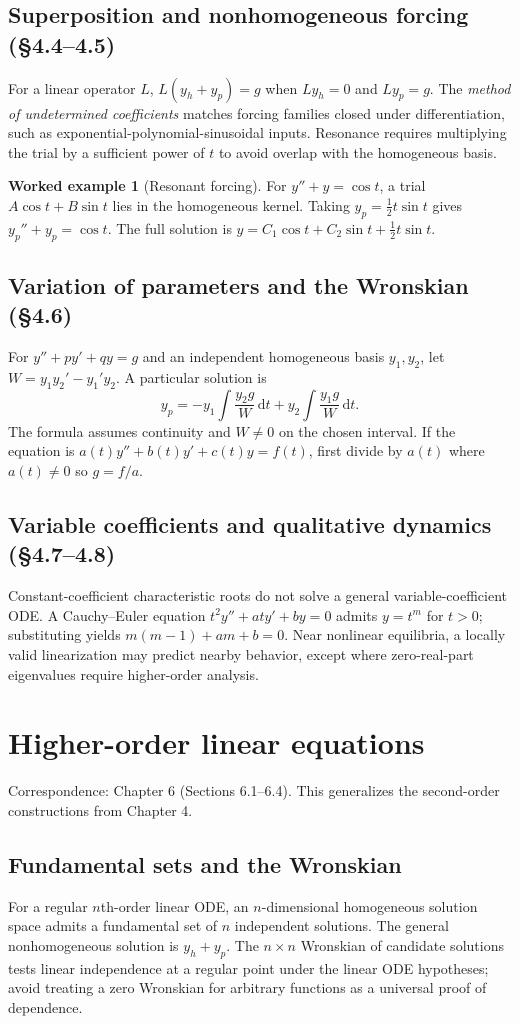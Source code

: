 \documentclass[11pt,letterpaper,oneside]{report}
\theoremstyle{definition}\newtheorem{definition}[theorem]{Definition}
\newtheorem{example}[theorem]{Worked example}
\theoremstyle{remark}\newtheorem{remark}[theorem]{Remark}
\newcommand{\dd}{\,\mathrm{d}}
\begin{document}
\section{Superposition and nonhomogeneous forcing (\S4.4--4.5)}
For a linear operator $L$, $L(y_h+y_p)=g$ when $Ly_h=0$ and $Ly_p=g$. The \emph{method of undetermined coefficients} matches forcing families closed under differentiation, such as exponential-polynomial-sinusoidal inputs. Resonance requires multiplying the trial by a sufficient power of $t$ to avoid overlap with the homogeneous basis.
\begin{example}[Resonant forcing]
For $y''+y=\cos t$, a trial $A\cos t+B\sin t$ lies in the homogeneous kernel. Taking $y_p=\tfrac12 t\sin t$ gives $y_p''+y_p=\cos t$. The full solution is $y=C_1\cos t+C_2\sin t+\tfrac12t\sin t$.
\end{example}
\section{Variation of parameters and the Wronskian (\S4.6)}
For $y''+p y'+q y=g$ and an independent homogeneous basis $y_1,y_2$, let $W=y_1y_2'-y_1'y_2$. A particular solution is
\[y_p=-y_1\int\frac{y_2 g}{W}\dd t+y_2\int\frac{y_1 g}{W}\dd t.\]
The formula assumes continuity and $W\ne0$ on the chosen interval. If the equation is $a(t)y''+b(t)y'+c(t)y=f(t)$, first divide by $a(t)$ where $a(t)\ne0$ so $g=f/a$.
\section{Variable coefficients and qualitative dynamics (\S4.7--4.8)}
Constant-coefficient characteristic roots do not solve a general variable-coefficient ODE. A Cauchy--Euler equation $t^2y''+a t y'+b y=0$ admits $y=t^m$ for $t>0$; substituting yields $m(m-1)+a m+b=0$. Near nonlinear equilibria, a locally valid linearization may predict nearby behavior, except where zero-real-part eigenvalues require higher-order analysis.
\chapter{Higher-order linear equations}
\begin{bookground}Correspondence: Chapter 6 (Sections 6.1--6.4). This generalizes the second-order constructions from Chapter 4.\end{bookground}
\section{Fundamental sets and the Wronskian}
For a regular $n$th-order linear ODE, an $n$-dimensional homogeneous solution space admits a fundamental set of $n$ independent solutions. The general nonhomogeneous solution is $y_h+y_p$. The $n\times n$ Wronskian of candidate solutions tests linear independence at a regular point under the linear ODE hypotheses; avoid treating a zero Wronskian for arbitrary functions as a universal proof of dependence.
\end{document}
